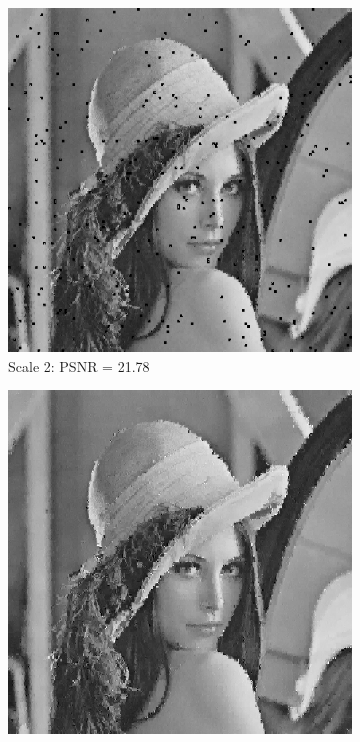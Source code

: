 \begin{figure}
\begin{subfigure}{0.4\textwidth}
    \includegraphics[width=\textwidth]{Chapter5/Images/lenna_haar2.png}
    \caption{Scale 2: PSNR = 21.78}
  \end{subfigure}
  \begin{subfigure}{0.4\textwidth}
    \includegraphics[width=\textwidth]{Chapter5/Images/lenna_haar3.png}

\end{subfigure}
\end{figure}
